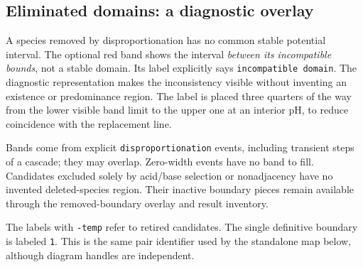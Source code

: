 \documentclass[a4paper,11pt]{ltxdoc}
\begin{document}
\subsection{Eliminated domains: a diagnostic overlay}
A species removed by disproportionation has no common stable potential interval.
The optional red band shows the interval \emph{between its incompatible bounds},
not a stable domain. Its label explicitly says \texttt{incompatible domain}.
The diagnostic representation makes the inconsistency visible without
inventing an existence or predominance region. The label is placed three quarters
of the way from the lower visible band limit to the upper one at an interior pH,
to reduce coincidence with the replacement line.

Bands come from explicit \texttt{disproportionation} events, including transient
steps of a cascade; they may overlap. Zero-width events have no band to fill.
Candidates excluded solely by acid/base selection or nonadjacency have no
invented deleted-species region. Their inactive boundary pieces remain available
through the removed-boundary overlay and result inventory.

\begin{codeexample}[width=9cm]
\end{codeexample}
The labels with \texttt{-temp} refer to retired candidates. The single definitive
boundary is labeled \texttt{1}. This is the same pair identifier used by the
standalone map below, although diagram handles are independent.
\end{document}
